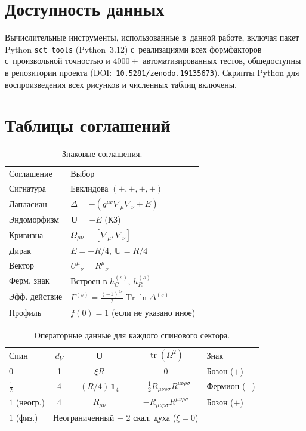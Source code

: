 \documentclass[aps,prd,twocolumn,superscriptaddress,nofootinbib,floatfix]{revtex4-2}
\theoremstyle{definition}
\theoremstyle{remark}
\newcommand{\Riemsq}{R_{\mu\nu\rho\sigma}R^{\mu\nu\rho\sigma}}
\newcommand{\tr}{\operatorname{tr}}
\newcommand{\Tr}{\operatorname{Tr}}
\begin{document}
\section*{Доступность данных}
Вычислительные инструменты, использованные в~данной работе, включая
пакет Python \texttt{sct\_tools} (Python~3.12) с~реализациями всех
формфакторов с~произвольной точностью и $4000+$ автоматизированных тестов,
общедоступны в репозитории проекта (DOI:~\texttt{10.5281/zenodo.19135673}).
Скрипты Python для воспроизведения всех рисунков и численных таблиц
включены.

\appendix

\section{Таблицы соглашений}
\label{app:conventions}

\begin{table}[h]
\caption{Знаковые соглашения.}
{\small
\begin{ruledtabular}
\begin{tabular}{@{}p{2.8cm}p{4.7cm}@{}}
Соглашение & Выбор \\
\colrule
Сигнатура & Евклидова $(+,+,+,+)$ \\
Лапласиан & $\Delta = -(g^{\mu\nu}\nabla_\mu\nabla_\nu + E)$ \\
Эндоморфизм & $\mathbf{U} = -E$ (КЗ) \\
Кривизна & $\Omega_{\mu\nu} = [\nabla_\mu, \nabla_\nu]$ \\
Дирак & $E = -R/4$, $\mathbf{U} = R/4$ \\
Вектор & $U^\mu{}_\nu = R^\mu{}_\nu$ \\
Ферм. знак & Встроен в $h_C^{(s)}$, $h_R^{(s)}$ \\
Эфф. действие & $\Gamma^{(s)} = \frac{(-1)^{2s}}{2}\Tr\ln\Delta^{(s)}$ \\
Профиль & $f(0) = 1$ (если не указано иное) \\
\end{tabular}
\end{ruledtabular}
}
\end{table}

\begin{table}[h]
\caption{Операторные данные для каждого спинового сектора.}
\label{tab:operator-data}
\begin{ruledtabular}
\begin{tabular}{lcccl}
Спин & $d_V$ & $\mathbf{U}$ & $\tr(\Omega^2)$ & Знак \\
\colrule
$0$ & 1 & $\xi R$ & $0$ & Бозон ($+$) \\
$\frac{1}{2}$ & 4 & $(R/4)\,\mathbf{1}_4$ & $-\frac{1}{2}\Riemsq$ & Фермион ($-$) \\
$1$ (неогр.) & 4 & $R_{\mu\nu}$ & $-\Riemsq$ & Бозон ($+$) \\
$1$ (физ.) & \multicolumn{3}{c}{Неограниченный $-$ 2 скал. духа ($\xi = 0$)} & \\
\end{tabular}
\end{ruledtabular}
\end{table}
\end{document}
